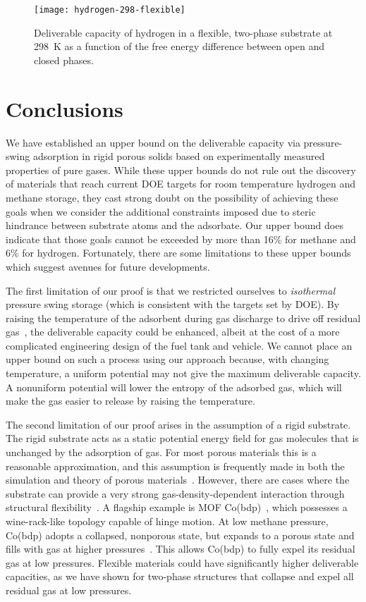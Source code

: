 \documentclass[pre,twocolumn]{revtex4-2}
\begin{document}
\begin{figure}
    \centering
    \texttt{[image: hydrogen-298-flexible]}
    \caption{Deliverable capacity of hydrogen in a flexible, two-phase substrate at 298\ K as a function of the free energy difference 
      between open and closed phases.}
    \label{fig:hydrogen-flexible}
\end{figure}


\section{Conclusions}
We have established an upper bound on the deliverable capacity via
pressure-swing adsorption in rigid porous solids based on experimentally
measured properties of pure gases. While these upper bounds do not rule out the
discovery of materials that reach current DOE targets for room temperature hydrogen and methane storage, they cast strong doubt
on the possibility of achieving these goals when we consider the additional
constraints imposed due to steric hindrance between substrate atoms and the
adsorbate. Our upper bound does indicate that those goals cannot be exceeded by
more than 16\% for methane and 6\% for hydrogen. Fortunately, there are some
limitations to these upper bounds which suggest avenues for future developments.

The first limitation of our proof is that we restricted ourselves to
\emph{isothermal} pressure swing storage (which is consistent with the targets set by DOE). By raising the temperature of the
adsorbent during gas discharge to drive off residual
gas~\cite{gomez2014exploring}, the deliverable capacity could be enhanced,
albeit at the cost of a more complicated engineering design of the fuel tank
and vehicle.
%
We cannot place an upper bound on such a process using our approach because, with
changing temperature, a uniform potential may not give the maximum deliverable
capacity.  A nonuniform potential will lower the entropy of the adsorbed gas,
which will make the gas easier to release by raising the temperature.


The second limitation of our proof arises in the assumption of a rigid
substrate. The rigid substrate acts as a static potential energy field for gas
molecules that is unchanged by the adsorption of gas. For most porous materials
this is a reasonable approximation, and this assumption is frequently made in
both the simulation and theory of porous materials~\cite{duren2009using}.
However, there are cases where the substrate can provide a very strong
gas-density-dependent interaction through structural
flexibility~\cite{schneemann2014flexible}. A flagship example is MOF
Co(bdp)~\cite{choi2008broadly}, which possesses a wine-rack-like topology
capable of hinge motion. At low methane pressure, Co(bdp) adopts a collapsed,
nonporous state, but expands to a porous state and fills with gas at higher
pressures~\cite{mason2015methane}. This allows Co(bdp) to fully expel its
residual gas at low pressures. Flexible materials could have significantly 
higher deliverable capacities, as we have shown for two-phase structures 
that collapse and expel all residual gas at low pressures.
\end{document}

